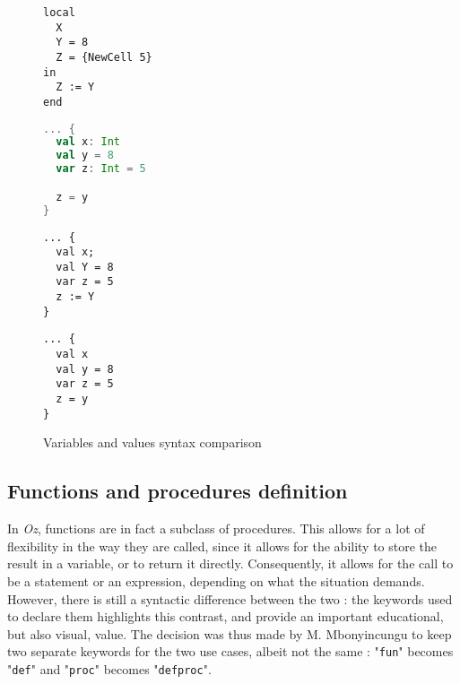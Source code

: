 \begin{figure}
    \noindent\begin{minipage}{.49\textwidth}
    \begin{lstlisting}[title={Oz},language=oz]
local
  X
  Y = 8
  Z = {NewCell 5}
in
  Z := Y
end
    \end{lstlisting}
\end{minipage}
\hfill
    \noindent\begin{minipage}{.49\textwidth}
    \begin{lstlisting}[title={Scala/Ozma},language=scala]
... {
  val x: Int
  val y = 8
  var z: Int = 5

  z = y
}
    \end{lstlisting}
\end{minipage}
    \noindent\begin{minipage}{.49\textwidth}
    \begin{lstlisting}[title={NewOz 2020},language=newoz]
... {
  val x;
  val Y = 8
  var z = 5
  z := Y
}
    \end{lstlisting}
\end{minipage}
\hfill
    \noindent\begin{minipage}{.49\textwidth}
    \begin{lstlisting}[title={NewOz 2021},language=newoz]
... {
  val x
  val y = 8
  var z = 5
  z = y
}
    \end{lstlisting}
\end{minipage}
\caption{Variables and values syntax comparison}
\label{fig:code-comp-var}
\end{figure}

\subsection{Functions and procedures definition}
In \textit{Oz}, functions are in fact a subclass of procedures.
This allows for a lot of flexibility in the way they are called, since it allows for the ability to store the result in a variable, or to return it directly.
Consequently, it allows for the call to be a statement or an expression, depending on what the situation demands.
However, there is still a syntactic difference between the two : the keywords used to declare them highlights this contrast, and provide an important educational, but also visual, value.
The decision was thus made by M. Mbonyincungu to keep two separate keywords for the two use cases, albeit not the same : "\texttt{fun}" becomes "\texttt{def}" and "\texttt{proc}" becomes "\texttt{defproc}".\newline


